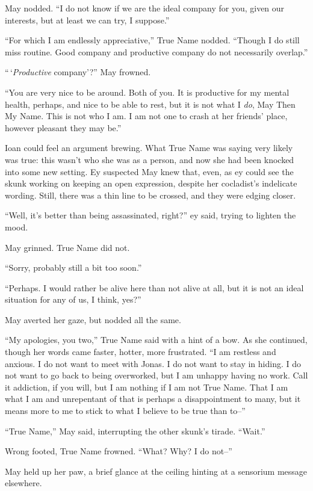 May nodded. ``I do not know if we are the ideal company for you, given our interests, but at least we can try, I suppose.''

``For which I am endlessly appreciative,'' True Name nodded. ``Though I do still miss routine. Good company and productive company do not necessarily overlap.''

``\,`\emph{Productive} company'?'' May frowned.

``You are very nice to be around. Both of you. It is productive for my mental health, perhaps, and nice to be able to rest, but it is not what I \emph{do}, May Then My Name. This is not who I am. I am not one to crash at her friends' place, however pleasant they may be.''

Ioan could feel an argument brewing. What True Name was saying very likely was true: this wasn't who she was as a person, and now she had been knocked into some new setting. Ey suspected May knew that, even, as ey could see the skunk working on keeping an open expression, despite her cocladist's indelicate wording. Still, there was a thin line to be crossed, and they were edging closer.

``Well, it's better than being assassinated, right?'' ey said, trying to lighten the mood.

May grinned. True Name did not.

``Sorry, probably still a bit too soon.''

``Perhaps. I would rather be alive here than not alive at all, but it is not an ideal situation for any of us, I think, yes?''

May averted her gaze, but nodded all the same.

``My apologies, you two,'' True Name said with a hint of a bow. As she continued, though her words came faster, hotter, more frustrated. ``I am restless and anxious. I do not want to meet with Jonas. I do not want to stay in hiding. I do not want to go back to being overworked, but I am unhappy having no work. Call it addiction, if you will, but I am nothing if I am not True Name. That I am what I am and unrepentant of that is perhaps a disappointment to many, but it means more to me to stick to what I believe to be true than to--''

``True Name,'' May said, interrupting the other skunk's tirade. ``Wait.''

Wrong footed, True Name frowned. ``What? Why? I do not--''

May held up her paw, a brief glance at the ceiling hinting at a sensorium message elsewhere.


